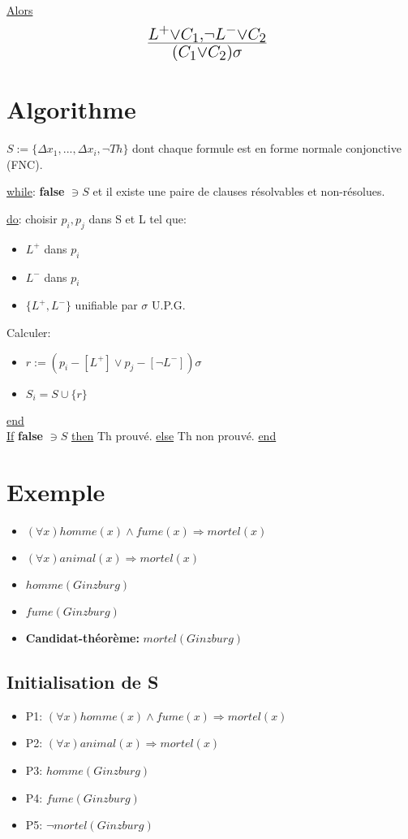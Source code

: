\underline{Alors} $$ \mbox{\huge $\frac{L^{+} \vee C_1, \neg L^{-} \vee C_2}{(C_1 \vee C_2)\sigma}$ } $$

\section{Algorithme}

$S := \big\{ \Delta x_1, ..., \Delta x_i, \neg Th \big\}$ dont chaque formule est en forme normale conjonctive (FNC). 


\underline{while}: \textbf{false} $\ni S$ et il existe une paire de clauses résolvables et non-résolues.

\underline{do}: choisir $p_i, p_j$ dans S et L tel que:
\begin{itemize}
  \item $L^{+}$ dans $p_i$ 
  \item $L^{-}$ dans $p_i$ 
  \item $\big\{ L^{+}, L^{-} \big\}$ unifiable par $\sigma$ U.P.G.
\end{itemize}

Calculer:
\begin{itemize}
  \item $r:=(p_i - [L^{+}] \vee p_j - [\neg L^{-}]) \sigma$
  \item $S_i = S \cup  \big\{ r \big\}$
\end{itemize}

\underline{end}\\

\underline{If} \textbf{false} $\ni S$ \underline{then} Th prouvé. \underline{else} Th non prouvé. \underline{end}

\section{Exemple}
\begin{itemize}
  \item $(\forall x) homme(x) \wedge fume(x) \Rightarrow mortel(x)$
  \item $(\forall x) animal(x) \Rightarrow mortel(x)$
  \item $homme(Ginzburg)$
  \item $fume(Ginzburg)$
  \item \textbf{Candidat-théorème:} $mortel(Ginzburg)$
\end{itemize}

\subsection{Initialisation de S}
\begin{itemize}
  \item P1: $(\forall x) homme(x) \wedge fume(x) \Rightarrow mortel(x)$
  \item P2: $(\forall x) animal(x) \Rightarrow mortel(x)$
  \item P3: $homme(Ginzburg)$
  \item P4: $fume(Ginzburg)$
  \item P5: $\neg mortel(Ginzburg)$
\end{itemize}

